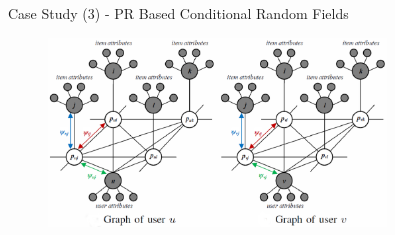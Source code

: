 \documentclass[
 size=14pt,
 paper=smartboard,  %
 mode=present, 		%
 display=slides, 	%
 style=tuliplab,  	%
 pauseslide,
 fleqn,leqno]{powerdot}{}
\begin{document}


\begin{slide}[toc=,bm=]{Case Study (3) - PR Based Conditional Random Fields}
	
	\begin{figure}[htbp]
		
		\includegraphics[width=0.8\textwidth]{figures//theme3//Theme3_5_3.eps}
		
	\end{figure}
	
	
	
\end{slide}

\end{document}
